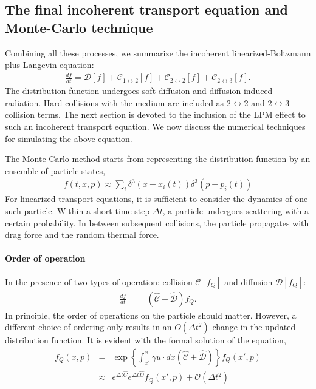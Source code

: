\subsection{The final incoherent transport equation and Monte-Carlo technique}
Combining all these processes, we summarize the incoherent linearized-Boltzmann plus Langevin equation:
\begin{eqnarray}
\frac{df}{dt} = \mathcal{D}[f] + \mathcal{C}_{1\leftrightarrow 2}[f] + \mathcal{C}_{2\leftrightarrow 2}[f] + \mathcal{C}_{2\leftrightarrow 3}[f].
\end{eqnarray}
The distribution function undergoes soft diffusion and diffusion induced-radiation. 
Hard collisions with the medium are included as $2\leftrightarrow 2$ and $2\leftrightarrow 3$ collision terms.
The next section is devoted to the inclusion of the LPM effect to such an incoherent transport equation.
We now discuss the numerical techniques for simulating the above equation.

The Monte Carlo method starts from representing the distribution function by an ensemble of particle states,
\begin{eqnarray}
f(t,x,p) \approx \sum_{i} \delta^3(x-x_i(t)) \delta^3(p-p_i(t))
\end{eqnarray}
For linearized transport equations, it is sufficient to consider the dynamics of one such particle.
Within a short time step $\Delta t$, a particle undergoes scattering with a certain probability.
In between subsequent collisions, the particle propagates with drag force and the random thermal force.

\paragraph{Order of operation} In the presence of two types of operation: collision $\mathcal{C}[f_Q]$ and diffusion $\mathcal{D}[f_Q]$:
\begin{eqnarray}
\nonumber
  \frac{df}{dt}  &=& 
\left( \mathcal{\hat{C}} + \mathcal{\hat{D}} \right) f_Q.
\end{eqnarray}
In principle, the order of operations on the particle should matter.
However, a different choice of ordering only results in an $O(\Delta t^2)$ change in the updated distribution function.
It is evident with the formal solution of the equation,
\begin{eqnarray}
\nonumber
f_Q(x,p) &=& \exp\left\{ \int_{x'}^x \gamma u \cdot dx \left( \mathcal{\hat{C}} + \mathcal{\hat{D}} \right) \right\} f_Q(x',p)\\
&\approx & e^{\Delta t \hat{C}}e^{\Delta t \hat{D}} f_Q(x', p) + \mathcal{O}(\Delta t^2)
\end{eqnarray}

